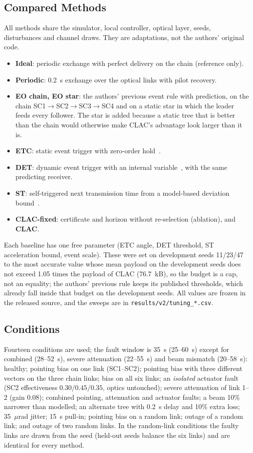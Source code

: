 \documentclass[journal]{IEEEtran}
\begin{document}
\subsection{Compared Methods}
All methods share the simulator, local controller, optical layer, seeds, disturbances and channel draws. They are adaptations, not the authors' original code.
\begin{itemize}
\item \textbf{Ideal}: periodic exchange with perfect delivery on the chain (reference only).
\item \textbf{Periodic}: 0.2~s exchange over the optical links with pilot recovery.
\item \textbf{EO chain, EO star}: the authors' previous event rule with prediction, on the chain SC1$\to$SC2$\to$SC3$\to$SC4 and on a static star in which the leader feeds every follower. The star is added because a static tree that is better than the chain would otherwise make CLAC's advantage look larger than it is.
\item \textbf{ETC}: static event trigger with zero-order hold~\cite{tabuada2007}.
\item \textbf{DET}: dynamic event trigger with an internal variable~\cite{girard2015}, with the same predicting receiver.
\item \textbf{ST}: self-triggered next transmission time from a model-based deviation bound~\cite{mazo2010,heemels2012}.
\item \textbf{CLAC-fixed}: certificate and horizon without re-selection (ablation), and \textbf{CLAC}.
\end{itemize}
Each baseline has one free parameter (ETC angle, DET threshold, ST acceleration bound, event scale). These were set on development seeds 11/23/47 to the most accurate value whose mean payload on the development seeds does not exceed 1.05 times the payload of CLAC (76.7~kB), so the budget is a cap, not an equality; the authors' previous rule keeps its published thresholds, which already fall inside that budget on the development seeds. All values are frozen in the released source, and the sweeps are in \texttt{results/v2/tuning\_*.csv}.

\subsection{Conditions}
Fourteen conditions are used; the fault window is 35~s (25--60~s) except for combined (28--52~s), severe attenuation (22--55~s) and beam mismatch (20--58~s): healthy; pointing bias on one link (SC1--SC2); pointing bias with three different vectors on the three chain links; bias on all six links; an \emph{isolated} actuator fault (SC2 effectiveness $0.30/0.45/0.35$, optics untouched); severe attenuation of link 1--2 (gain 0.08); combined pointing, attenuation and actuator faults; a beam 10\% narrower than modelled; an alternate tree with 0.2~s delay and 10\% extra loss; 35~$\mu$rad jitter; 15~s pull-in; pointing bias on a random link; outage of a random link; and outage of two random links. In the random-link conditions the faulty links are drawn from the seed (held-out seeds balance the six links) and are identical for every method.
\end{document}
